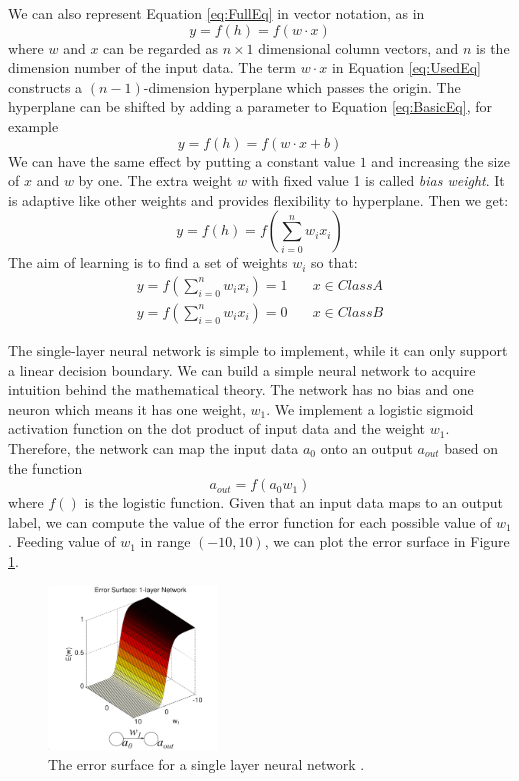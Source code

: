 We can also represent Equation \ref{eq:FullEq} in vector notation, as in 
\begin{equation}\label{eq:UsedEq}
y = f(h) = f(w \cdot x)
\end{equation}
where $w$ and $x$ can be regarded as $n\times1$ dimensional column vectors, and $n$ is the dimension number of the input data.
The term $w \cdot x$ in Equation \ref{eq:UsedEq} constructs a $(n-1)$-dimension hyperplane which passes the origin. The hyperplane can be shifted by adding a parameter to Equation \ref{eq:BasicEq}, for example
\begin{equation}\label{eq:WithBias}
y = f(h) = f(w \cdot x + b)
\end{equation}
We can have the same effect by putting a constant value $1$ and increasing the size of $x$ and $w$ by one. The extra weight $w$ with fixed value 1 is called \textit{bias weight}. It is adaptive like other weights and provides flexibility to hyperplane. Then we get:
\begin{equation}\label{eq:finalEq}
y = f(h) = f(\sum_{i=0}^{n}w_{i}x_{i})
\end{equation}
The aim of learning is to find a set of weights $w_{i}$ so that:
\begin{align*}
y = f(\sum_{i=0}^{n}w_{i}x_{i}) = 1  & \quad x \in Class A\\
y = f(\sum_{i=0}^{n}w_{i}x_{i}) = 0  & \quad x \in Class B
\end{align*}

The single-layer neural network is simple to implement, while it can only support a linear decision boundary. We can build a simple neural network to acquire intuition behind the mathematical theory. The network has no bias and one neuron which means it has one weight, $w_{1}$. We implement a logistic sigmoid activation function on the dot product of input data and the weight $w_{1}$. Therefore, the network can map the input data $a_0$ onto an output $a_{out}$ based on the function
\begin{equation}\label{eq:1LayerExample}
a_{out} = f(a_{0}w_{1})
\end{equation}
where $f()$ is the logistic function. Given that an input data maps to an output label, we can compute the value of the error function for each possible value of $w_{1}$. Feeding value of $w_{1}$ in range $(-10,10)$, we can plot the error surface in Figure \ref{fig:1LayerErrorSurface}.
\graphicspath{ {./Figures/} }
\begin{figure}[!htb]
\centering
\includegraphics[width=0.4\textwidth]{1LayerErrorSurface.png}
\caption{\label{fig:1LayerErrorSurface}The error surface for a single layer neural network \citep{ErrorFigure1}.}
\end{figure}

